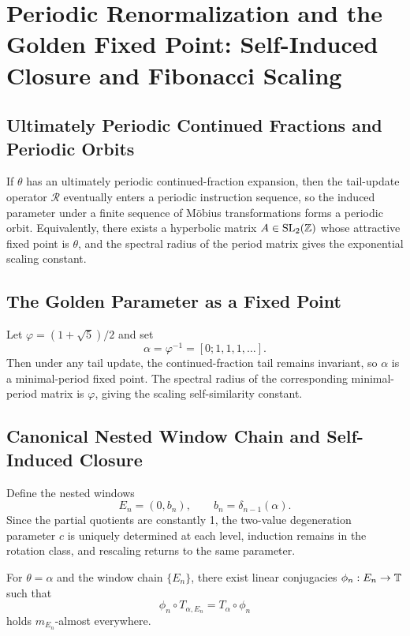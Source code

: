 \section{Periodic Renormalization and the Golden Fixed Point: Self-Induced Closure and Fibonacci Scaling}

\subsection{Ultimately Periodic Continued Fractions and Periodic Orbits}

If $\theta$ has an ultimately periodic continued-fraction expansion, then the tail-update operator $\mathcal{R}$ eventually enters a periodic instruction sequence, so the induced parameter under a finite sequence of Möbius transformations forms a periodic orbit. Equivalently, there exists a hyperbolic matrix $A\in \mathrm{SL}_2(\mathbb{Z})$ whose attractive fixed point is $\theta$, and the spectral radius of the period matrix gives the exponential scaling constant.

\subsection{The Golden Parameter as a Fixed Point}

Let $\varphi=(1+\sqrt 5)/2$ and set
\[
\alpha=\varphi^{-1}=[0;1,1,1,\dots].
\]
Then under any tail update, the continued-fraction tail remains invariant, so $\alpha$ is a minimal-period fixed point. The spectral radius of the corresponding minimal-period matrix is $\varphi$, giving the scaling self-similarity constant.

\subsection{Canonical Nested Window Chain and Self-Induced Closure}

Define the nested windows
\[
E_n=(0,b_n),\qquad b_n=\delta_{n-1}(\alpha).
\]
Since the partial quotients are constantly 1, the two-value degeneration parameter $c$ is uniquely determined at each level, induction remains in the rotation class, and rescaling returns to the same parameter.

\begin{theorem}\label{thm:golden-self-induced}
For $\theta=\alpha$ and the window chain $\{E_n\}$, there exist linear conjugacies $\phi_n:E_n\to\mathbb{T}$ such that
\[
\phi_n\circ T_{\alpha,E_n}=T_\alpha\circ \phi_n
\]
holds $m_{E_n}$-almost everywhere.
\end{theorem}

